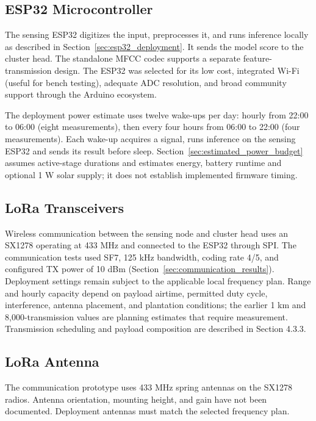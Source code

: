\documentclass[12pt,a4paper,oneside]{memoir}
\newcommand{\newrevision}[1]{#1}
\begin{document}
\subsection{ESP32 Microcontroller}

\newrevision{The sensing ESP32 digitizes the input, preprocesses it, and runs inference locally as described in Section~\ref{sec:esp32_deployment}. It sends the model score to the cluster head. The standalone MFCC codec supports a separate feature-transmission design.} The ESP32 was selected for its low cost, integrated Wi-Fi (useful for bench testing), adequate ADC resolution, and broad community support through the Arduino ecosystem.

\newrevision{The deployment power estimate uses twelve wake-ups per day: hourly from 22:00 to 06:00 (eight measurements), then every four hours from 06:00 to 22:00 (four measurements). Each wake-up acquires a signal, runs inference on the sensing ESP32 and sends its result before sleep. Section~\ref{sec:estimated_power_budget} assumes active-stage durations and estimates energy, battery runtime and optional 1 W solar supply; it does not establish implemented firmware timing.}

\subsection{LoRa Transceivers}

Wireless communication between the sensing node and cluster head uses an SX1278 operating at 433 MHz and connected to the ESP32 through SPI. \newrevision{The communication tests used SF7, 125 kHz bandwidth, coding rate 4/5, and configured TX power of 10 dBm (Section~\ref{sec:communication_results}). Deployment settings remain subject to the applicable local frequency plan.} Range and hourly capacity depend on payload airtime, permitted duty cycle, interference, antenna placement, and plantation conditions; the earlier 1 km and 8,000-transmission values are planning estimates that require measurement. Transmission scheduling and payload composition are described in Section 4.3.3.

\subsection{LoRa Antenna}

\newrevision{The communication prototype uses 433 MHz spring antennas on the SX1278 radios. Antenna orientation, mounting height, and gain have not been documented. Deployment antennas must match the selected frequency plan.}
\end{document}
